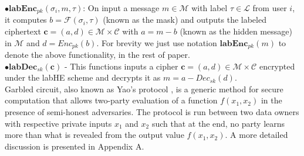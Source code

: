 $\bullet \textbf{labEnc}_{pk}(\sigma_i, m , \tau)$: On input a message $m \in \mathcal{M} $ with label $\tau \in \mathcal{L}$  from user $i$, it computes $b=\mathcal{F}(\sigma_i, \tau)$ (known as the mask) and outputs the labeled ciphertext $\mathbf{c}=(a,d) \in \mathcal{M} \times \mathcal{C}$ with $ a= m- b$  (known as the hidden message) in $\mathcal{M}$ and $d=Enc_{pk}(b)$. For brevity we just use notation $\textbf{labEnc}_{pk}(m)$ to denote the above functionality, in the rest of paper. \\
$\bullet \textbf{labDec}_{sk}(\mathbf{c})$ - This functions inputs a cipher $\mathbf{c}=(a,d) \in \mathcal{M} \times \mathcal{C}$ encrypted under the labHE scheme and decrypts it as $m=a-Dec_{sk}(d)$.\\
Garbled circuit, also known as Yao's protocol \cite{Yao,Yao2},  is a generic method for secure  computation that allows two-party evaluation of a function $f(x_1,x_2)$ in the presence of semi-honest adversaries. The protocol is run between two data owners with respective private inputs $x_1$ and $x_2$ such that at the end, no party learns more  
than what is revealed from the output value $f(x_1,x_2)$.  
A more detailed discussion is presented in Appendix A.
